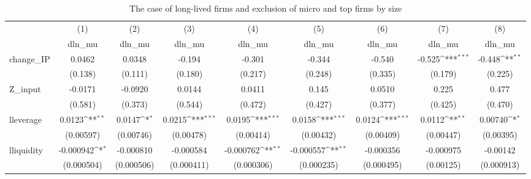 \begin{table}[htbp]\centering
\def\sym#1{\ifmmode^{#1}\else\(^{#1}\)\fi}
\caption{The case of long-lived firms and exclusion of micro and top firms by size}
\begin{tabular}{l*{8}{c}}
\hline\hline
            &\multicolumn{1}{c}{(1)}&\multicolumn{1}{c}{(2)}&\multicolumn{1}{c}{(3)}&\multicolumn{1}{c}{(4)}&\multicolumn{1}{c}{(5)}&\multicolumn{1}{c}{(6)}&\multicolumn{1}{c}{(7)}&\multicolumn{1}{c}{(8)}\\
            &\multicolumn{1}{c}{dln\_mu}&\multicolumn{1}{c}{dln\_mu}&\multicolumn{1}{c}{dln\_mu}&\multicolumn{1}{c}{dln\_mu}&\multicolumn{1}{c}{dln\_mu}&\multicolumn{1}{c}{dln\_mu}&\multicolumn{1}{c}{dln\_mu}&\multicolumn{1}{c}{dln\_mu}\\
\hline
change\_IP   &      0.0462         &      0.0348         &      -0.194         &      -0.301         &      -0.344         &      -0.540         &      -0.525\sym{***}&      -0.448\sym{**} \\
            &     (0.138)         &     (0.111)         &     (0.180)         &     (0.217)         &     (0.248)         &     (0.335)         &     (0.179)         &     (0.225)         \\
[1em]
Z\_input     &     -0.0171         &     -0.0920         &      0.0144         &      0.0411         &       0.145         &      0.0510         &       0.225         &       0.477         \\
            &     (0.581)         &     (0.373)         &     (0.544)         &     (0.472)         &     (0.427)         &     (0.377)         &     (0.425)         &     (0.470)         \\
[1em]
lleverage   &      0.0123\sym{**} &      0.0147\sym{*}  &      0.0215\sym{***}&      0.0195\sym{***}&      0.0158\sym{***}&      0.0124\sym{***}&      0.0112\sym{**} &     0.00740\sym{*}  \\
            &   (0.00597)         &   (0.00746)         &   (0.00478)         &   (0.00414)         &   (0.00432)         &   (0.00409)         &   (0.00447)         &   (0.00395)         \\
[1em]
lliquidity  &   -0.000942\sym{*}  &   -0.000810         &   -0.000584         &   -0.000762\sym{**} &   -0.000557\sym{**} &   -0.000356         &   -0.000975         &    -0.00142         \\
            &  (0.000504)         &  (0.000506)         &  (0.000411)         &  (0.000306)         &  (0.000235)         &  (0.000495)         &   (0.00125)         &  (0.000913)         \\

\end{tabular}
\end{table}
